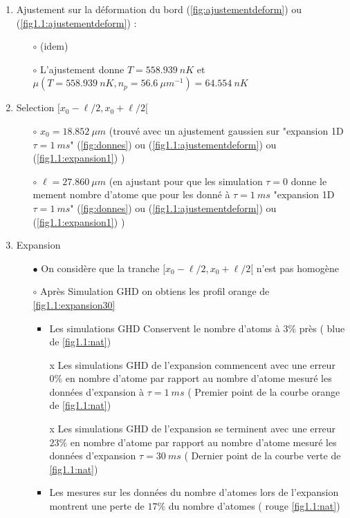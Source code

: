 \documentclass[a3, 10pt,twoside]{article}          %
\theoremstyle{plain}
\theoremstyle{definition}
\theoremstyle{remark}
\theoremstyle{definition} %
\def\OliveGreen{OliveGreen}
\begin{document}
			\begin{enumerate}[label =\Alph*)]
				


				
				\item Ajustement sur la déformation du bord (\ref{fig:ajustementdeform}) ou (\ref{fig1.1:ajustementdeform}) :

					\begin{enumerate}[label =\alph*)]
						\item[$\circ$] (idem)
						\item[$\circ$] L'ajustement donne $T = 558.939 ~nK$ et $\mu( T=558.939 ~nK , n_p = 56.6 ~{\mu m}^{-1} ) = 64.554~nK $ 
					\end{enumerate}
					
				\item Selection $[ x_0 - \ell/2 , x_0 + \ell/2[$ 
					\begin{itemize}
								\item[$\circ$] $x_0 = 18.852 ~\mu m $ (trouvé avec un ajustement gaussien sur {\color{OliveGreen}"expansion 1D $\tau =1~ms$" (\ref{fig:donnes})} ou {\color{orange} (\ref{fig1.1:ajustementdeform}) } ou {\color{blue}(\ref{fig1.1:expansion1})} ) 
								\item[$\circ$] $\ell = 27.860 ~ \mu m $ (en ajustant pour que les simulation $ \tau = 0$ donne le mement nombre d'atome que pour les donné à $\tau = 1~ms$  {\color{OliveGreen}"expansion 1D $\tau =1~ms$" (\ref{fig:donnes})} ou {\color{orange} (\ref{fig1.1:ajustementdeform}) } ou {\color{blue}(\ref{fig1.1:expansion1})} )
							\end{itemize}
				\item Expansion 
					\begin{itemize}
								\item[$\bullet$]	 On considère que la tranche $[ x_0 - \ell/2 , x_0 + \ell/2[$ n'est pas homogène 
								\item[$\circ$] Après Simulation GHD on obtiens les profil {\color{orange} orange de \ref{fig1.1:expansion30}}  
									\begin{itemize}
										\item Les simulations GHD Conservent le nombre d'atoms à $3\%$ près ({\color{blue} blue de \ref{fig1.1:nat}})
										\item[x] Les simulations GHD de l'expansion commencent avec une erreur $0\%$ en nombre d'atome par rapport au nombre d'atome mesuré les données d'expansion à $\tau = 1~ms$ ({\color{orange} Premier point de la courbe orange de \ref{fig1.1:nat}}) 
										\item[x] Les simulations GHD de l'expansion se terminent avec une erreur $23\%$ en nombre d'atome par rapport au nombre d'atome mesuré les données d'expansion $\tau = 30~ms$ ({\color{\OliveGreen} Dernier point de la courbe verte de \ref{fig1.1:nat}})
										\item Les mesures sur les données du nombre d'atomes lors de l'expansion montrent une perte de $17\%$ du nombre d'atomes ({\color{red} rouge \ref{fig1.1:nat}})
									\end{itemize}	 	
							\end{itemize}

			\end{enumerate}
			
\end{document}
